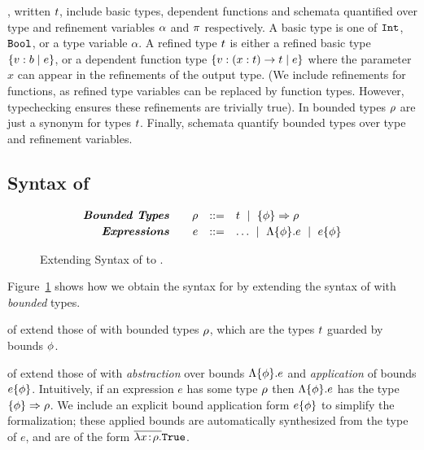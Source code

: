  \corelan, written $t$, include basic types,
dependent functions and schemata quantified over type and refinement
variables $\alpha$ and $\pi$ respectively.
%
A basic type is one of $\texttt{Int}$, $\texttt{Bool}$, or a type
variable $\alpha$.
%
A refined type $t$ is either a refined basic type $\left\lbrace v : b\mid e\right\rbrace$,
or a dependent function type $\left\lbrace v : {(x:t)} \rightarrow t\mid e\right\rbrace$ where
the parameter $x$ can appear in the refinements of the output type.
%
(We include refinements for functions, as refined type variables can be
replaced by function types. However, typechecking ensures these refinements
are trivially true).
%
In \corelan bounded types $\rho$ are just a synonym for types $t$.
%
Finally, schemata quantify bounded types over type
and refinement variables.

\subsection{Syntax of \boundedcorelan}\label{sec:syntax-boundedcorelan}

\begin{figure}[t!]
\centering
\captionsetup{justification=centering}
$$
\begin{array}{rrcl}
\centering

\emphbf{Bounded Types} \quad 
  & \bt         & ::= & \rtyp 
                        \spmid \tconstraint{\constraint}{\bt} \\[0.03in]

\emphbf{Expressions} \quad 
  & e           & ::= & \dots 
                        \spmid \econstraint{\constraint}{e} 
                        \spmid \econstantconstraint{e}{\constraint} \\
\end{array}
$$
\caption{Extending Syntax of \corelan to \boundedcorelan.} 
\label{fig:boundedsyntax}
\end{figure}

Figure~\ref{fig:boundedsyntax} shows how we obtain the syntax for
\boundedcorelan by extending the syntax of \corelan with
\emph{bounded} types.

 of \boundedcorelan extend those of \corelan with
bounded types $\rho$, which are the types $t$ guarded by bounds
$\phi$.

 of \boundedcorelan extend those of \corelan
with \emph{abstraction} over bounds $\Lambda \{\phi \} . e $ and
\emph{application} of bounds $ e \{ \phi \} $.
%
Intuitively, if an expression $e$ has some type $\rho$
then $\Lambda \{\phi \} . e $ has the type
$\{ {\phi} \} \Rightarrow \rho $.
%
We include an explicit bound application form
$ e \{ \phi \} $ to simplify
the formalization; these applied bounds are automatically
synthesized from the type of $e$, and are of the form
$\overline{\lambda {x\!:\!\ensuremath{\rho}}. }{\mathtt{True}}$.

